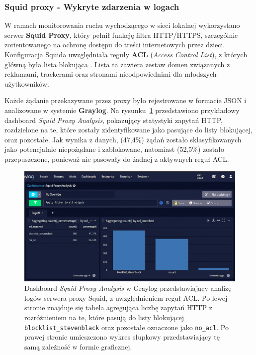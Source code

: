 \documentclass[
    left=2.5cm,         %
    right=2.5cm,        %
    top=2.5cm,          %
    bottom=3cm,         %
    bindingoffset=6mm,  %
    nohyphenation=true %
]{eiti/eiti-thesis} %
\begin{document}
\subsubsection{Squid proxy - Wykryte zdarzenia w logach}

W ramach monitorowania ruchu wychodzącego w sieci lokalnej wykorzystano serwer \textbf{Squid Proxy}, który pełnił funkcję filtra HTTP/HTTPS, szczególnie zorientowanego na ochronę dostępu do treści internetowych przez dzieci. Konfiguracja Squida uwzględniała reguły \textbf{ACL} (\textit{Access Control List}), z których główną była lista blokująca \cite{stevenblack-blocklist}. Lista ta zawiera zestaw domen związanych z reklamami, trackerami oraz stronami nieodpowiednimi dla młodszych użytkowników.

Każde żądanie przekazywane przez proxy było rejestrowane w formacie JSON i analizowane w systemie \textbf{Graylog}. Na rysunku~\ref{fig:graylog-squid-logs} przedstawiono przykładowy dashboard \textit{Squid Proxy Analysis}, pokazujący statystyki zapytań HTTP, rozdzielone na te, które zostały zidentyfikowane jako pasujące do listy blokującej, oraz pozostałe. Jak wynika z danych, (47{,}4\%) żądań zostało sklasyfikowanych jako potencjalnie niepożądane i zablokowane, natomiast (52{,}5\%) zostało przepuszczone, ponieważ nie pasowały do żadnej z aktywnych reguł ACL.

\newpage
\begin{figure}[H]
    \centering
    \includegraphics[width=\textwidth]{img/graylog_proxy.png}
    \caption{Dashboard \textit{Squid Proxy Analysis} w Graylog przedstawiający analizę logów serwera proxy Squid, z uwzględnieniem reguł ACL. Po lewej stronie znajduje się tabela agregująca liczbę zapytań HTTP z rozróżnieniem na te, które pasują do listy blokującej \texttt{blocklist\_stevenblack} oraz pozostałe oznaczone jako \texttt{no\_acl}. Po prawej stronie umieszczono wykres słupkowy przedstawiający tę samą zależność w formie graficznej.}
    \label{fig:graylog-squid-logs}
\end{figure}
\end{document}

